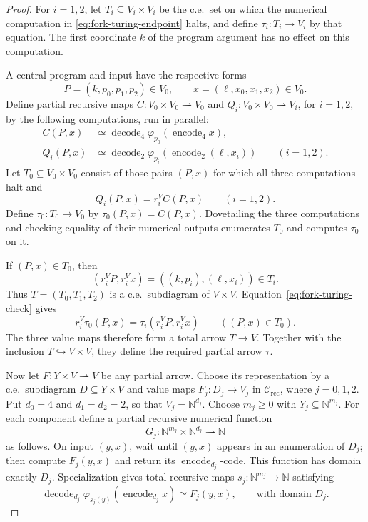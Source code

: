 \documentclass[11pt]{article}
\newcommand{\N}{\mathbb N}
\begin{document}
\begin{proof}
For $i=1,2$, let $T_i\subseteq V_i\times V_i$ be the c.e.\ set
on which the numerical computation in
\eqref{eq:fork-turing-endpoint} halts, and define
$\tau_i:T_i\to V_i$ by that equation. The first coordinate $k$
of the program argument has no effect on this computation.

A central program and input have the respective forms
\[
 P=(k,p_0,p_1,p_2)\in V_0,
 \qquad x=(\ell,x_0,x_1,x_2)\in V_0.
\]
Define partial recursive maps
$C:V_0\times V_0\rightharpoonup V_0$ and
$Q_i:V_0\times V_0\rightharpoonup V_i$, for $i=1,2$,
by the following computations, run in parallel:
\begin{align*}
 C(P,x)&\simeq
   \operatorname{decode}_4
      \varphi_{p_0}(\operatorname{encode}_4 x),\\
 Q_i(P,x)&\simeq
   \operatorname{decode}_2
      \varphi_{p_i}(\operatorname{encode}_2(\ell,x_i))
      \qquad(i=1,2).
\end{align*}
Let $T_0\subseteq V_0\times V_0$ consist of those pairs $(P,x)$
for which all three computations halt and
\begin{equation}\label{eq:fork-turing-check}
 Q_i(P,x)=r_i^V C(P,x)\qquad(i=1,2).
\end{equation}
Define $\tau_0:T_0\to V_0$ by $\tau_0(P,x)=C(P,x)$.
Dovetailing the three computations and checking equality of their
numerical outputs enumerates $T_0$ and computes $\tau_0$ on it.

If $(P,x)\in T_0$, then
\[
 (r_i^V P,r_i^V x)=((k,p_i),(\ell,x_i))\in T_i.
\]
Thus $T=(T_0,T_1,T_2)$ is a c.e.\ subdiagram of $V\times V$.
Equation~\eqref{eq:fork-turing-check} gives
\[
 r_i^V\tau_0(P,x)
   =\tau_i(r_i^V P,r_i^V x)
 \qquad((P,x)\in T_0).
\]
The three value maps therefore form a total arrow $T\to V$.
Together with the inclusion $T\hookrightarrow V\times V$,
they define the required partial arrow $\tau$.

Now let $F:Y\times V\rightharpoonup V$ be any partial arrow.
Choose its representation by a c.e.\ subdiagram
$D\subseteq Y\times V$ and value maps
$F_j:D_j\to V_j$ in $\mathcal C_{\mathrm{rec}}$, where $j=0,1,2$.
Put $d_0=4$ and $d_1=d_2=2$, so that $V_j=\N^{d_j}$.
Choose $m_j\geq0$ with $Y_j\subseteq\N^{m_j}$.
For each component define a partial recursive numerical function
\[
 G_j:\N^{m_j}\times\N^{d_j}\rightharpoonup\N
\]
as follows. On input $(y,x)$, wait until $(y,x)$ appears in an
enumeration of $D_j$; then compute $F_j(y,x)$ and return its
$\operatorname{encode}_{d_j}$-code. This function has domain
exactly $D_j$.
Specialization gives total recursive maps
$s_j:\N^{m_j}\to\N$ satisfying
\begin{equation}\label{eq:fork-specialization}
 \operatorname{decode}_{d_j}
   \varphi_{s_j(y)}(\operatorname{encode}_{d_j}x)
 \simeq F_j(y,x),
 \qquad\text{with domain }D_j.
\end{equation}


\end{proof}
\end{document}
